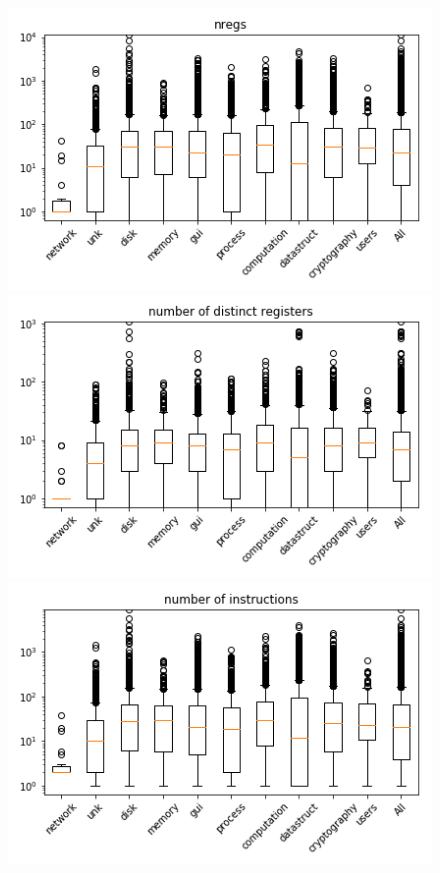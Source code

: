 \begin{appendices}
\begin{figure}[H]
%
\centering
\includegraphics[width=0.9\linewidth]{img/boxplots/v1_unbalanced_nregs.png}
\endminipage
{}%
\centering
\includegraphics[width=0.9\linewidth]{img/boxplots/v1_unbalanced_number_of_distinct_registers.png}
\endminipage
{}%
\centering
\includegraphics[width=0.9\linewidth]{img/boxplots/v1_unbalanced_number_of_instructions.png}
\endminipage



\end{figure}
\end{appendices}
